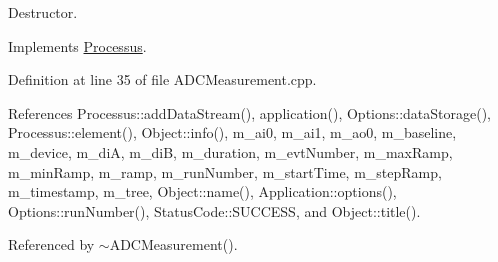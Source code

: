 Destructor. 



Implements \hyperlink{classProcessus_aee88ad7b77ae7319cf8b128e9dd2ea11}{Processus}.



Definition at line 35 of file A\+D\+C\+Measurement.\+cpp.



References Processus\+::add\+Data\+Stream(), application(), Options\+::data\+Storage(), Processus\+::element(), Object\+::info(), m\+\_\+ai0, m\+\_\+ai1, m\+\_\+ao0, m\+\_\+baseline, m\+\_\+device, m\+\_\+diA, m\+\_\+diB, m\+\_\+duration, m\+\_\+evt\+Number, m\+\_\+max\+Ramp, m\+\_\+min\+Ramp, m\+\_\+ramp, m\+\_\+run\+Number, m\+\_\+start\+Time, m\+\_\+step\+Ramp, m\+\_\+timestamp, m\+\_\+tree, Object\+::name(), Application\+::options(), Options\+::run\+Number(), Status\+Code\+::\+S\+U\+C\+C\+E\+SS, and Object\+::title().



Referenced by $\sim$\+A\+D\+C\+Measurement().


